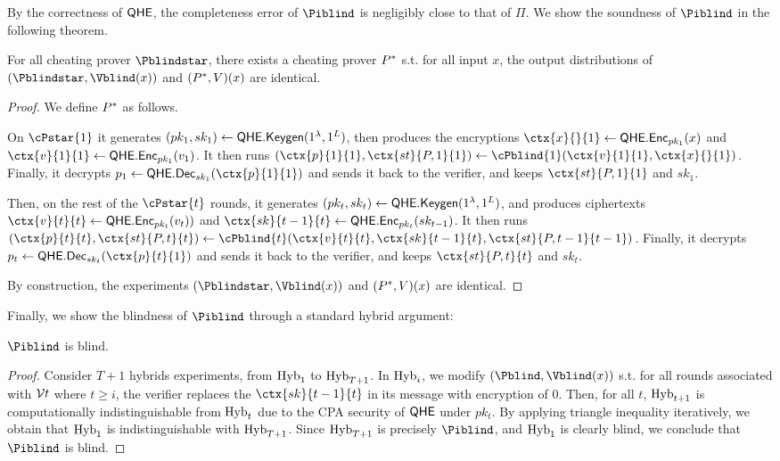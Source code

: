 By the correctness of $\mathsf{QHE}$, the completeness error of $\Piblind$ is negligibly close to that of $\Pi$.
We show the soundness of $\Piblind$ in the following theorem.

\begin{theorem}
	For all cheating prover $\Pblindstar$, there exists a cheating prover $P^*$ s.t. for all input $x$, the output distributions of $(\Pblindstar, \Vblind(x))$ and $(P^*, V)(x)$ are identical.
\end{theorem}
\begin{proof}
	We define $P^*$ as follows.
	
	On $\cPstar{1}$ it generates
	$(pk_1, sk_1)\leftarrow\mathsf{QHE.Keygen}(1^\lambda, 1^L)$, then produces the encryptions
	$\ctx{x}{}{1}\leftarrow\QEnc_{pk_1}(x)$ and $\ctx{v}{1}{1}\leftarrow\QEnc_{pk_1}(v_1)$.
	It then runs $(\ctx{p}{1}{1}, \ctx{st}{P, 1}{1})\leftarrow\cPblind{1}(\ctx{v}{1}{1}, \ctx{x}{}{1})$.
	Finally, it decrypts $p_1\leftarrow\QDec_{sk_1}(\ctx{p}{1}{1})$ and sends it back to the verifier,
	and keeps $\ctx{st}{P, 1}{1}$ and $sk_1$.

	Then, on the rest of the $\cPstar{t}$ rounds, it generates
	$(pk_t, sk_t)\leftarrow\mathsf{QHE.Keygen}(1^\lambda, 1^L)$, and produces ciphertexts
	$\ctx{v}{t}{t}\leftarrow\QEnc_{pk_t}(v_t))$ and $\ctx{sk}{t-1}{t}\leftarrow\QEnc_{pk_t}(sk_{t-1})$.
	It then runs $(\ctx{p}{t}{t}, \ctx{st}{P, t}{t})\leftarrow\cPblind{t}(\ctx{v}{t}{t}, \ctx{sk}{t-1}{t}, \ctx{st}{P, t-1}{t-1})$.
	Finally, it decrypts $p_t\leftarrow\QDec_{sk_t}(\ctx{p}{t}{1})$ and sends it back to the verifier,
	and keeps $\ctx{st}{P, t}{t}$ and $sk_t$.
		
	By construction, the experiments $(\Pblindstar, \Vblind(x))$ and $(P^*, V)(x)$ are identical.
\end{proof}

Finally, we show the blindness of $\Piblind$ through a standard hybrid argument:
\begin{theorem}
	$\Piblind$ is blind.
\end{theorem}
\begin{proof}
	Consider $T+1$ hybrids experiments, from $\operatorname{Hyb}_1$ to $\operatorname{Hyb}_{T+1}$.
	In $\operatorname{Hyb}_i$, we modify $(\Pblind, \Vblind(x))$ s.t.
	for all rounds associated with $\mathcal{V}{t}$ where $t\geq i$, the verifier replaces the $\ctx{sk}{t-1}{t}$ in its message with encryption of $0$.
	Then, for all $t$, $\operatorname{Hyb}_{t+1}$ is computationally indistinguishable from $\operatorname{Hyb}_t$ due to the CPA security of $\mathsf{QHE}$ under $pk_t$.
	By applying triangle inequality iteratively, we obtain that $\operatorname{Hyb}_1$ is indistinguishable with $\operatorname{Hyb}_{T+1}$.
	Since $\operatorname{Hyb}_{T+1}$ is precisely $\Piblind$, and $\operatorname{Hyb}_1$ is clearly blind, we conclude that $\Piblind$ is blind.
\end{proof}
